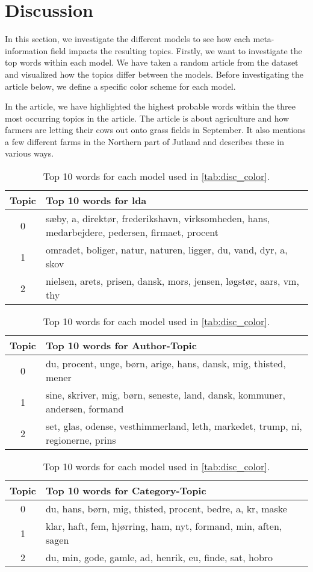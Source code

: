 \section{Discussion}\label{sec:discussion}
In this section, we investigate the different models to see how each meta-information field impacts the resulting topics.
Firstly, we want to investigate the top words within each model.
We have taken a random article from the dataset and visualized how the topics differ between the models. 
Before investigating the article below, we define a specific color scheme for each model.

In the article, we have highlighted the highest probable words within the three most occurring topics in the article.
The article is about agriculture and how farmers are letting their cows out onto grass fields in September. 
It also mentions a few different farms in the Northern part of Jutland and describes these in various ways.

\begin{table}
	\caption{Top 10 words for each model used in \autoref{tab:disc_color}.}
	\label{tab:top_words_three_models}
	\begin{tabular}{c|p{}}
		Topic & Top 10 words for \gls{lda} \\
		\midrule
		0 & sæby, a, direktør, frederikshavn, virksomheden, hans, medarbejdere, pedersen, firmaet, procent \\
		1 & omradet, boliger, natur, naturen, ligger, du, vand, dyr, a, skov \\
		2 & nielsen, arets, prisen, dansk, mors, jensen, løgstør, aars, vm, thy \\
	\end{tabular}
	\begin{tabular}{c|p{}}
		\midrule
		Topic & Top 10 words for Author-Topic \\
		\midrule
		0 & du, procent, unge, børn, arige, hans, dansk, mig, thisted, mener\\
		1 & sine, skriver, mig, børn, seneste, land, dansk, kommuner, andersen, formand \\
		2 & set, glas, odense, vesthimmerland, leth, markedet, trump, ni, regionerne, prins\\
	\end{tabular}
	\begin{tabular}{c|p{}}
		\midrule
		Topic & Top 10 words for Category-Topic \\
		\midrule
		0 & du, hans, børn, mig, thisted, procent, bedre, a, kr, maske \\
		1 & klar, haft, fem, hjørring, ham, nyt, formand, min, aften, sagen\\
		2 & du, min, gode, gamle, ad, henrik, eu, finde, sat, hobro\\
	\end{tabular}
\end{table}

